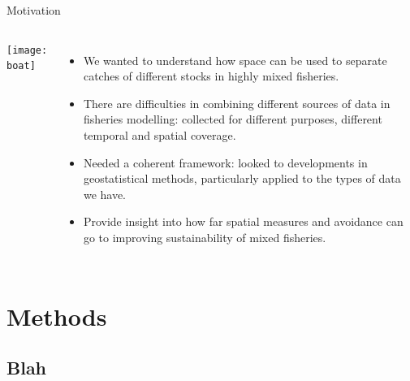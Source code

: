 \documentclass[xcolor=x11names,compress]{beamer}
\renewcommand{\(}{\begin{columns}}
\renewcommand{\)}{\end{columns}}
\newcommand{\<}[1]{\begin{column}{#1}}
\renewcommand{\>}{\end{column}}
\begin{document}
\begin{frame}{Motivation}

\begin{columns}
	
\column{0.3\paperwidth}
\texttt{[image: boat]}

\column{0.7\paperwidth}
\begin{itemize}
\small	
\setlength\itemsep{1em}

	\item We wanted to understand how space can be used to separate catches
		of different stocks in highly mixed fisheries. \pause
	\item There are difficulties in combining different sources of data in
		fisheries modelling: collected for different purposes,
		different temporal and spatial coverage. \pause
	\item Needed a coherent framework: looked to developments in
		geostatistical methods, particularly applied to the types of
		data we have. \pause
	\item Provide insight into how far spatial measures and avoidance can
		go to improving sustainability of mixed fisheries.

\end{itemize}



\end{columns}

\end{frame}


\section{Methods}
\subsection{Blah}
\end{document}
